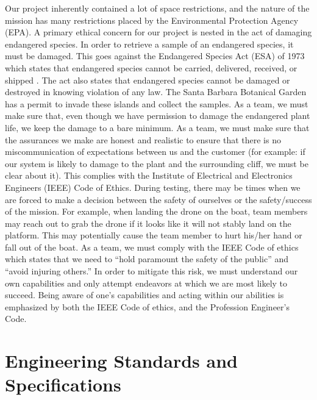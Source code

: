 \documentclass{wrcecapstone}
\begin{document}
Our project inherently contained a lot of space restrictions, and the nature of the mission has many restrictions placed by the Environmental Protection Agency (EPA).  A primary ethical concern for our project is nested in the act of damaging endangered species.  In order to retrieve a sample of an endangered species, it must be damaged.  This goes against the Endangered Species Act (ESA) of 1973 which states that endangered species cannot be carried, delivered, received, or shipped \cite{czech2001endangered}.  The act also states that endangered species cannot be damaged or destroyed in knowing violation of any law.  The Santa Barbara Botanical Garden has a permit to invade these islands and collect the samples.  As a team, we must make sure that, even though we have permission to damage the endangered plant life, we keep the damage to a bare minimum.  As a team, we must make sure that the assurances we make are honest and realistic to ensure that there is no miscommunication of expectations between us and the customer (for example: if our system is likely to damage to  the plant and the surrounding cliff, we must be clear about it).  This complies with the Institute of Electrical and Electronics Engineers (IEEE) Code of Ethics.  During testing, there may be times when we are forced to make a decision between the safety of ourselves or the safety/success of the mission.  For example, when landing the drone on the boat, team members may reach out to grab the drone if it looks like it will not stably land on the platform.  This may potentially cause the team member to hurt his/her hand or fall out of the boat.  As a team, we must comply with the IEEE Code of ethics which states that we need to ``hold paramount the safety of the public'' and ``avoid injuring others.''  In order to mitigate this risk, we must understand our own capabilities and only attempt endeavors at which we are most likely to succeed.  Being aware of one’s capabilities and acting within our abilities is emphasized by both the IEEE Code of ethics, and the Profession Engineer’s Code. 





\section{Engineering Standards and Specifications}
\end{document}
